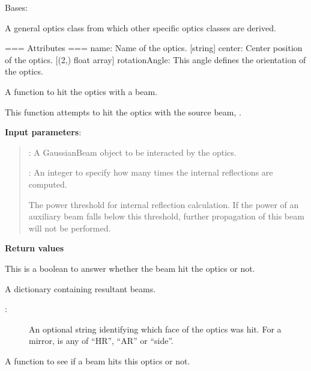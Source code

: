 \documentclass[letterpaper,10pt,english]{sphinxmanual}
\begin{document}
\begin{fulllineitems}
\label{api/gtrace:gtrace.optcomp.Optics}
Bases: 

A general optics class from which other specific
optics classes are derived.

=== Attributes ===
name: Name of the optics. {[}string{]}
center: Center position of the optics. {[}(2,) float array{]}
rotationAngle: This angle defines the orientation of the optics.

\begin{fulllineitems}
\label{api/gtrace:gtrace.optcomp.Optics.hit}
A function to hit the optics with a beam.

This function attempts to hit the optics with the source beam, .

\textbf{Input parameters}:
\begin{quote}

:
A GaussianBeam object to be interacted by the optics.

:
An integer to specify how many times the internal reflections
are computed.

The power threshold for internal reflection calculation.
If the power of an auxiliary beam falls below this threshold,
further propagation of this beam will not be performed.
\end{quote}

\textbf{Return values}

This is a boolean to answer whether the beam hit the optics
or not.

A dictionary containing resultant beams.
\begin{description}
\item[{:}] \leavevmode
An optional string identifying which face of the optics was hit.
For a mirror,  is any of ``HR'', ``AR'' or ``side''.

\end{description}

\end{fulllineitems}


\begin{fulllineitems}
\label{api/gtrace:gtrace.optcomp.Optics.isHit}
A function to see if a beam hits this optics or not.


\end{fulllineitems}
\end{fulllineitems}
\end{document}
